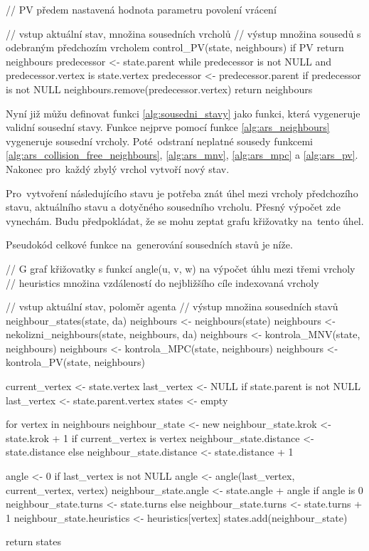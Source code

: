 \begin{code}[fontsize=\footnotesize]
// PV předem nastavená hodnota parametru povolení vrácení

// vstup aktuální stav, množina sousedních vrcholů
// výstup množina sousedů s odebraným předchozím vrcholem
control_PV(state, neighbours)
  if PV
    return neighbours
  predecessor <- state.parent
  while predecessor is not NULL and predecessor.vertex is state.vertex
    predecessor <- predecessor.parent
  if predecessor is not NULL
    neighbours.remove(predecessor.vertex)
  return neighbours
\end{code}

Nyní již můžu definovat funkci \ref{alg:sousedni_stavy} jako funkci, která vygeneruje validní sousední stavy.
Funkce nejprve pomocí funkce \ref{alg:ars_neighbours} vygeneruje sousední vrcholy.
Poté~odstraní neplatné sousedy funkcemi \ref{alg:ars_collision_free_neighbours},
\ref{alg:ars_mnv}, \ref{alg:ars_mpc} a \ref{alg:ars_pv}.
Nakonec pro~každý zbylý vrchol vytvoří nový stav.

Pro~vytvoření následujícího stavu je potřeba znát
úhel mezi vrcholy předchozího stavu, aktuálního stavu a dotyčného sousedního vrcholu.
Přesný výpočet zde vynechám.
Budu předpokládat, že se mohu zeptat grafu křižovatky na~tento úhel.

Pseudokód celkové funkce na~generování sousedních stavů je níže.


\begin{code}[fontsize=\footnotesize]
// G graf křižovatky s funkcí angle(u, v, w) na výpočet úhlu mezi třemi vrcholy
// heuristics množina vzdáleností do nejbližšího cíle indexovaná vrcholy

// vstup aktuální stav, poloměr agenta
// výstup množina sousedních stavů
neighbour_states(state, da)
  neighbours <- neighbours(state)
  neighbours <- nekolizni_neighbours(state, neighbours, da)
  neighbours <- kontrola_MNV(state, neighbours)
  neighbours <- kontrola_MPC(state, neighbours)
  neighbours <- kontrola_PV(state, neighbours)

  current_vertex <- state.vertex
  last_vertex <- NULL
  if state.parent is not NULL
    last_vertex <- state.parent.vertex
  states <- empty

  for vertex in neighbours
    neighbour_state <- new
    neighbour_state.krok <- state.krok + 1
    if current_vertex is vertex
      neighbour_state.distance <- state.distance
    else
      neighbour_state.distance <- state.distance + 1

    angle <- 0
    if last_vertex is not NULL
      angle <- angle(last_vertex, current_vertex, vertex)
    neighbour_state.angle <- state.angle + angle
    if angle is 0
      neighbour_state.turns <- state.turns
    else
      neighbour_state.turns <- state.turns + 1
    neighbour_state.heuristics <- heuristics[vertex]
    states.add(neighbour_state)

  return states
\end{code}

